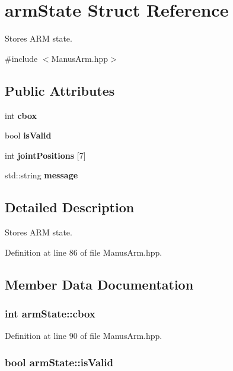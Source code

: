 \section{arm\-State \-Struct \-Reference}
\label{structarmState}


\-Stores \-A\-R\-M state.  




{\ttfamily \#include $<$\-Manus\-Arm.\-hpp$>$}

\subsection*{\-Public \-Attributes}
\begin{DoxyCompactItemize}
\item 
int {\bf cbox}
\item 
bool {\bf is\-Valid}
\item 
int {\bf joint\-Positions} [7]
\item 
std\-::string {\bf message}
\end{DoxyCompactItemize}


\subsection{\-Detailed \-Description}
\-Stores \-A\-R\-M state. 

\-Definition at line 86 of file \-Manus\-Arm.\-hpp.



\subsection{\-Member \-Data \-Documentation}
\subsubsection[{cbox}]{\setlength{\rightskip}{0pt plus 5cm}int {\bf arm\-State\-::cbox}}\label{structarmState_a1fc8092eb5a00eb0fde26a2bf8110344}


\-Definition at line 90 of file \-Manus\-Arm.\-hpp.

\subsubsection[{is\-Valid}]{\setlength{\rightskip}{0pt plus 5cm}bool {\bf arm\-State\-::is\-Valid}}\label{structarmState_ad1648fd84fe049f22366eb1152e312c6}


